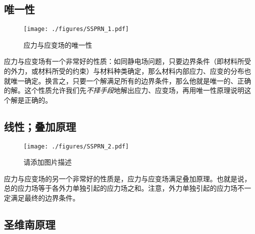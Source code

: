 
\begin{issues}
\issueDraft
\end{issues}

\subsection{唯一性}
\begin{figure}[ht]
\centering
\texttt{[image: ./figures/SSPRN\_1.pdf]}
\caption{应力与应变场的唯一性} \label{SSPRN_fig1}
\end{figure}
应力与应变场有一个非常好的性质：如同静电场问题，只要边界条件（即材料所受的外力，或材料所受的约束）与材料种类确定，那么材料内部应力、应变的分布也就唯一确定。换言之，只要一个解满足所有的边界条件，那么他就是唯一的、正确的解。这个性质允许我们先\textsl{不择手段}地解出应力、应变场，再用唯一性原理说明这个解是正确的。

\subsection{线性；叠加原理}
\begin{figure}[ht]
\centering
\texttt{[image: ./figures/SSPRN\_2.pdf]}
\caption{请添加图片描述} \label{SSPRN_fig2}
\end{figure}
应力与应变场的另一个非常好的性质是，应力与应变场满足叠加原理。也就是说，总的应力场等于各外力单独引起的应力场之和。注意，外力单独引起的应力场不一定满足最终的边界条件。

\subsection{圣维南原理}
